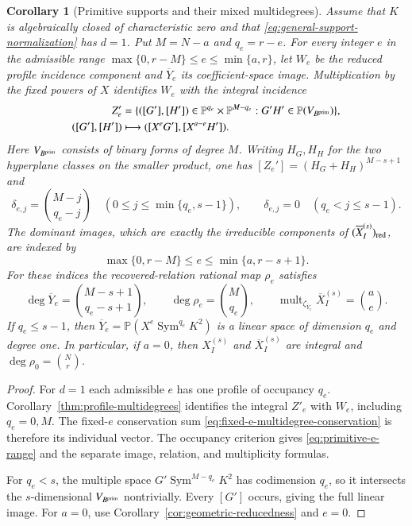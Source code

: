 \documentclass[10pt,fleqn]{article}
\numberwithin{equation}{section}
\newtheorem{corollary}[theorem]{Corollary}
\newcommand{\PP}{\mathbb P}
\begin{document}
\begin{corollary}[Primitive supports and their mixed multidegrees]
\label{cor:primitive-components}
Assume that $K$ is algebraically closed of characteristic zero and that
\eqref{eq:general-support-normalization} has $d=1$.  Put $M=N-a$ and
$q_e=r-e$.  For every integer $e$ in the admissible range
$\max\{0,r-M\}\le e\le\min\{a,r\}$, let $W_e$ be the reduced
profile incidence component and $\overline Y_e$ its coefficient-space
image.  Multiplication by the fixed powers of $X$ identifies $W_e$ with
the integral incidence
\begin{equation}\label{eq:primitive-incidence-model}
 \begin{split}
 Z_e'&=\{([G'],[H'])\in\PP^{q_e}\times\PP^{M-q_e}:
              G'H'\in\PP(V_{B^{\rm prim}})\},\\
 ([G'],[H'])&\longmapsto([X^eG'],[X^{a-e}H']).
 \end{split}
\end{equation}
Here $V_{B^{\rm prim}}$ consists of binary forms of degree $M$.
Writing $H_G,H_H$ for the two hyperplane classes on the smaller
product, one has $[Z_e']=(H_G+H_H)^{M-s+1}$ and
\begin{equation}\label{eq:primitive-mixed-degrees}
 \delta_{e,j}=\binom{M-j}{q_e-j}
 \quad(0\le j\le\min\{q_e,s-1\}),\qquad
 \delta_{e,j}=0\quad(q_e<j\le s-1).
\end{equation}
The dominant images, which are exactly the irreducible components of
$(\overline X_I^{(s)})_{\rm red}$, are indexed by
\begin{equation}\label{eq:primitive-e-range}
 \max\{0,r-M\}\le e\le\min\{a,r-s+1\}.
\end{equation}
For these indices the recovered-relation rational map $\rho_e$ satisfies
\begin{equation}\label{eq:primitive-projective-degrees}
 \deg\overline Y_e=\binom{M-s+1}{q_e-s+1},\qquad
 \deg\rho_e=\binom M{q_e},\qquad
 \operatorname{mult}_{\zeta_{\overline Y_e}}\overline X_I^{(s)}
       =\binom ae.
\end{equation}
If $q_e\le s-1$, then
$\overline Y_e=\PP(X^e\operatorname{Sym}^{q_e}K^2)$ is a linear
space of dimension $q_e$ and degree one.  In particular, if $a=0$,
then $X_I^{(s)}$ and $\overline X_I^{(s)}$ are integral and
$\deg\rho_0=\binom Nr$.
\end{corollary}

\begin{proof}
For $d=1$ each admissible $e$ has one profile of occupancy $q_e$.
Corollary~\ref{thm:profile-multidegrees} identifies the integral $Z'_e$
with $W_e$, including $q_e=0,M$.  The fixed-$e$ conservation sum
\eqref{eq:fixed-e-multidegree-conservation} is therefore its individual
vector.  The occupancy criterion gives \eqref{eq:primitive-e-range}
and the separate image, relation, and multiplicity formulas.

For $q_e<s$, the multiple space
$G'\operatorname{Sym}^{M-q_e}K^2$ has codimension $q_e$, so it
intersects the $s$-dimensional $V_{B^{\rm prim}}$ nontrivially.
Every $[G']$ occurs, giving the full linear image.
For $a=0$, use Corollary~\ref{cor:geometric-reducedness} and $e=0$.
\end{proof}
\end{document}
